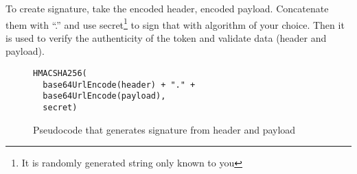 To create signature, take the encoded header, encoded payload. Concatenate them with ``.'' and use secret\footnote{It is randomly generated string only known to you} to sign that with algorithm of your choice. Then it is used to verify the authenticity of the token and validate data (header and payload).

\begin{figure}[!htbp]
\begin{verbatim}
HMACSHA256(
  base64UrlEncode(header) + "." +
  base64UrlEncode(payload),
  secret)
\end{verbatim}
\renewcommand\figurename{Code}
\caption{Pseudocode that generates signature from header and payload}
\label{src:signature}
\end{figure}

